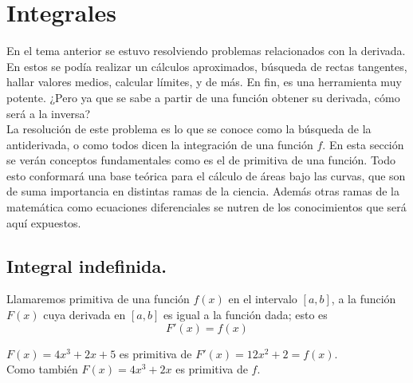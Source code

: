 \documentclass[10pt,twoside]{SelfArx} %
\begin{document}
    
    
    
    
    
    
    
    
    
    
    
    
    
 
 

\newpage


\section{Integrales}
En el tema anterior  se estuvo resolviendo problemas relacionados con la derivada. En estos se podía realizar un cálculos aproximados, búsqueda de rectas tangentes, hallar valores medios, calcular límites, y de más. En fin, es una herramienta muy potente. ¿Pero ya que se sabe a partir de una función obtener su derivada, cómo será a la inversa?\\
La resolución de este problema es lo que se conoce como la búsqueda de la antiderivada, o como todos dicen la integración de una función $ f $. En esta sección se verán conceptos fundamentales como es el de primitiva de una función. Todo esto conformará una base teórica para el cálculo de áreas bajo las curvas, que son de suma importancia en distintas ramas de la ciencia. Además otras ramas de la matemática como ecuaciones diferenciales se nutren de los conocimientos que será aquí expuestos.
 
 
 
 \subsection{Integral indefinida. }
 \begin{thm}
 	Llamaremos primitiva de una función $ f(x) $ en el intervalo $ [a,b] $, a la función $ F(x) $ cuya derivada en $ [a,b] $ es igual a la función dada; esto es
 	\begin{equation}
 	F'(x)=f(x)
 	\end{equation}
 \end{thm}
 \begin{ejemplo}
 	$ F(x)=4x^{3}+2x+5 $ es primitiva de $ F'(x)=12x^{2}+2=f(x) $.\\
 	Como tambi\'en $ F(x)=4x^{3}+2x $ es primitiva de $ f $.
 \end{ejemplo}
 
\end{document}
